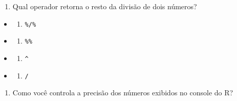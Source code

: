 \documentclass[
]{book}
\providecommand{\tightlist}{%
  \setlength{\itemsep}{0pt}\setlength{\parskip}{0pt}}
\begin{document}
\begin{enumerate}
\def\labelenumi{\arabic{enumi}.}
\setcounter{enumi}{7}
\tightlist
\item
  Qual operador retorna o resto da divisão de dois números?
\end{enumerate}

\begin{itemize}
\tightlist
\item
  \begin{enumerate}
  \def\labelenumi{\alph{enumi})}
  \tightlist
  \item
    \texttt{\%/\%}
  \end{enumerate}
\item
  \begin{enumerate}
  \def\labelenumi{\alph{enumi})}
  \setcounter{enumi}{1}
  \tightlist
  \item
    \texttt{\%\%}
  \end{enumerate}
\item
  \begin{enumerate}
  \def\labelenumi{\alph{enumi})}
  \setcounter{enumi}{2}
  \tightlist
  \item
    \texttt{\^{}}
  \end{enumerate}
\item
  \begin{enumerate}
  \def\labelenumi{\alph{enumi})}
  \setcounter{enumi}{3}
  \tightlist
  \item
    \texttt{/}
  \end{enumerate}
\end{itemize}

\begin{enumerate}
\def\labelenumi{\arabic{enumi}.}
\setcounter{enumi}{8}
\tightlist
\item
  Como você controla a precisão dos números exibidos no console do R?
\end{enumerate}
\end{document}
